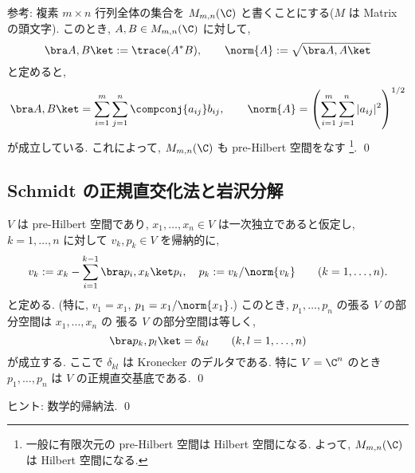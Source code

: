 \documentclass[12pt,twoside]{jarticle}
\begin{document}

\medskip
\noindent
参考: 
複素 $m\times n$ 行列全体の集合を $M_{m,n}(\C)$ と書くことにする($M$ は 
Matrix の頭文字).  このとき, $A,B\in M_{m,n}(\C)$ に対して,
\begin{equation*}
  \bra A, B\ket := \trace(A^*B), \qquad
  \norm{A} := \sqrt{\bra A, A\ket}
\end{equation*}
と定めると,
\begin{equation*}
  \bra A, B\ket = \sum_{i=1}^m\sum_{j=1}^n \compconj{a_{ij}} b_{ij},
  \qquad
  \norm{A} = \left(\sum_{i=1}^m\sum_{j=1}^n |a_{ij}|^2\right)^{1/2}
\end{equation*}
が成立している.  これによって, $M_{m,n}(\C)$ も pre-Hilbert 空間をなす%
\footnote{一般に有限次元の pre-Hilbert 空間は Hilbert 空間になる.
よって, $M_{m,n}(\C)$ は Hilbert 空間になる.}.
\qed


\subsection{Schmidt の正規直交化法と岩沢分解}


\begin{question}
\label{q:Schmidt}
  $V$ は pre-Hilbert 空間であり, 
  $x_1,\dots,x_n\in V$ は一次独立であると仮定し, 
  $k=1,\dots,n$ に対して $v_k,p_k\in V$ を帰納的に,
  \begin{equation*}
    v_k := x_k - \sum_{i=1}^{k-1} \bra p_i, x_k\ket p_i,
    \quad
    p_k := v_k / \norm{v_k}
    \qquad (k=1,\dots,n).
  \end{equation*}
  と定める. (特に, $v_1 = x_1$, $p_1 = x_1 / \norm{x_1}$.) %
  このとき, $p_1,\dots,p_n$ の張る $V$ の部分空間は $x_1,\dots,x_n$ の
  張る $V$ の部分空間は等しく, 
  \begin{equation*}
    \bra p_k, p_l \ket = \delta_{kl}
    \qquad (k,l=1,\dots,n)
  \end{equation*}
  が成立する. ここで $\delta_{kl}$ は Kronecker のデルタである. 
  特に $V=\C^n$ のとき $p_1,\dots,p_n$ は $V$ の正規直交基底である. \qed
\end{question}

\noindent
ヒント: 数学的帰納法.
\qed

\medskip
\end{document}
